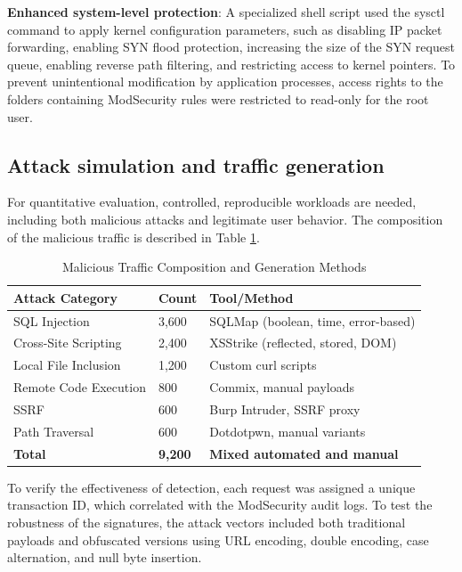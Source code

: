 \documentclass[10pt,conference]{IEEEtran}
\begin{document}
\textbf{Enhanced system-level protection}: A specialized shell script used the sysctl command to apply kernel configuration parameters, such as disabling IP packet forwarding, enabling SYN flood protection, increasing the size of the SYN request queue, enabling reverse path filtering, and restricting access to kernel pointers. To prevent unintentional modification by application processes, access rights to the folders containing ModSecurity rules were restricted to read-only for the root user.

\subsection{Attack simulation and traffic generation}

For quantitative evaluation, controlled, reproducible workloads are needed, including both malicious attacks and legitimate user behavior. The composition of the malicious traffic is described in Table \ref{tab:attacks}.

\begin{table}[!h]
\centering
\caption{Malicious Traffic Composition and Generation Methods}
\label{tab:attacks}
\small
\begin{tabular}{|p{2.1cm}|p{0.8cm}|p{3.4cm}|}
\hline
\textbf{Attack Category} & \textbf{Count} & \textbf{Tool/Method} \\
\hline
SQL Injection & 3,600 & SQLMap (boolean, time, error-based) \\
Cross-Site Scripting & 2,400 & XSStrike (reflected, stored, DOM) \\
Local File Inclusion & 1,200 & Custom curl scripts \\
Remote Code Execution & 800 & Commix, manual payloads \\
SSRF & 600 & Burp Intruder, SSRF proxy \\
Path Traversal & 600 & Dotdotpwn, manual variants \\
\hline
\textbf{Total} & \textbf{9,200} & \textbf{Mixed automated and manual} \\
\hline
\end{tabular}
\end{table}

To verify the effectiveness of detection, each request was assigned a unique transaction ID, which correlated with the ModSecurity audit logs. To test the robustness of the signatures, the attack vectors included both traditional payloads and obfuscated versions using URL encoding, double encoding, case alternation, and null byte insertion.
\end{document}
